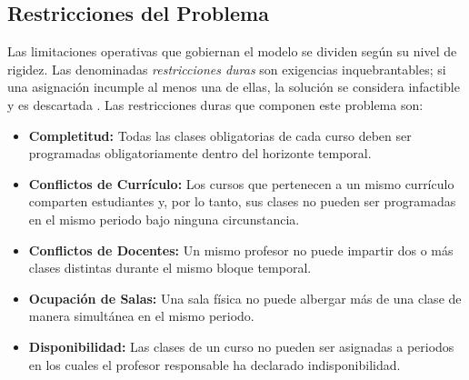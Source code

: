 \documentclass[letter, 10pt]{article}
\begin{document}
\subsection*{Restricciones del Problema}
Las limitaciones operativas que gobiernan el modelo se dividen según su nivel de rigidez. Las denominadas \textit{restricciones duras} son exigencias inquebrantables; si una asignación incumple al menos una de ellas, la solución se considera infactible y es descartada \cite{digaspero2007}. Las restricciones duras que componen este problema son:
\begin{itemize}
    \item \textbf{Completitud:} Todas las clases obligatorias de cada curso deben ser programadas obligatoriamente dentro del horizonte temporal.
    \item \textbf{Conflictos de Currículo:} Los cursos que pertenecen a un mismo currículo comparten estudiantes y, por lo tanto, sus clases no pueden ser programadas en el mismo periodo bajo ninguna circunstancia.
    \item \textbf{Conflictos de Docentes:} Un mismo profesor no puede impartir dos o más clases distintas durante el mismo bloque temporal.
    \item \textbf{Ocupación de Salas:} Una sala física no puede albergar más de una clase de manera simultánea en el mismo periodo.
    \item \textbf{Disponibilidad:} Las clases de un curso no pueden ser asignadas a periodos en los cuales el profesor responsable ha declarado indisponibilidad.
\end{itemize}
\end{document}
